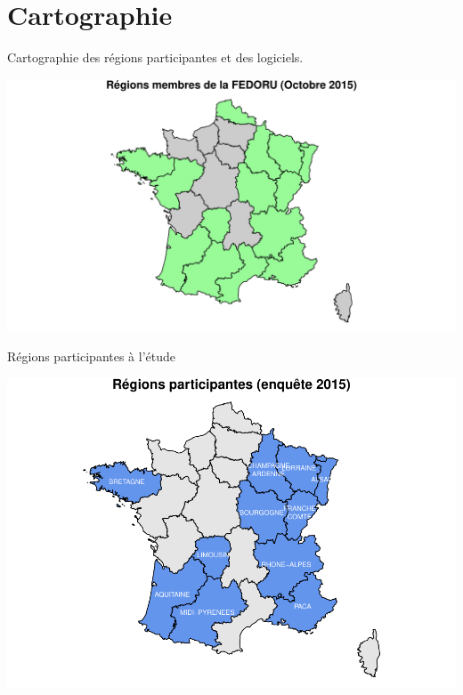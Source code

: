 \documentclass[]{article}
\begin{document}
\section{Cartographie}\label{cartographie}

Cartographie des régions participantes et des logiciels.

\includegraphics{septembre2015_files/figure-latex/carto_region-1.pdf}

Régions participantes à l'étude

\includegraphics{septembre2015_files/figure-latex/unnamed-chunk-4-1.pdf}
\end{document}
